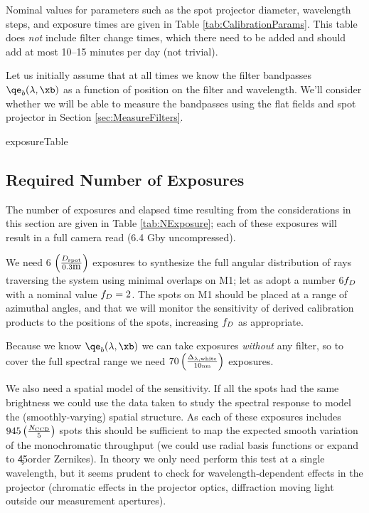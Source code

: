 Nominal values for parameters such as the spot projector diameter, wavelength steps, and exposure times are
given in Table \ref{tab:CalibrationParams}.  This table does \textit{not} include filter change times, which
there need to be added and should add at most 10--15 minutes per day (not trivial).

Let us initially assume that at all times we know the filter bandpasses $\qe_b(\lambda, \xb)$
as a function of position on the filter and wavelength.  We'll consider whether we will be able
to measure the bandpasses using the flat fields and spot projector in Section \ref{sec:MeasureFilters}.

%
%
{exposureTable}


\subsection{Required Number of Exposures}

The number of exposures and elapsed time resulting from the considerations in this section are given in Table
\ref{tab:NExposure}; each of these exposures will result in a full camera read (6.4 Gby uncompressed).

We need 6 $\left(\frac{D_{\mbox{\tiny spot}}}{0.3\mbox{m}}\right)$ exposures to synthesize the full angular distribution of rays traversing the
system using minimal overlaps on M1; let as adopt a number 6$f_D$ with a nominal value
$f_D = 2$.  The
spots on M1 should be placed at a range of azimuthal angles, and that we will monitor the sensitivity
of derived calibration products to the positions of the spots, increasing $f_D$ as appropriate.

Because we know $\qe_b(\lambda, \xb)$ we can take exposures \textit{without} any filter, so to cover
the full spectral range we need $70 \left(\frac{\Delta_{\lambda,\mbox{\tiny white}}}{10\mbox{\tiny nm}}\right)$ exposures.

We also need a spatial model of the sensitivity.  If all the spots had the same brightness we could use the
data taken to study the spectral response to model the (smoothly-varying) spatial structure.  As each of these
exposures includes $945 \left(\frac{N_{\mbox{\tiny CCD}}}{5}\right)$ spots this should be sufficient to map the expected smooth variation of the
monochromatic throughput (\eg we could use radial basis functions or expand to \c 45\th order Zernikes).  In
theory we only need perform this test at a single wavelength, but it seems prudent to check for
wavelength-dependent effects in the projector (\eg chromatic effects in the projector optics, diffraction
moving light outside our measurement apertures).

